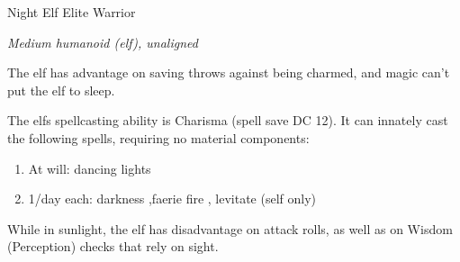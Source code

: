 \documentclass[letterpaper,10pt,twoside,twocolumn,openany]{book}
\begin{document}
\begin{monsterbox}{Night Elf Elite Warrior}
	\begin{hangingpar}
		\textit{Medium humanoid (elf), unaligned}
	\end{hangingpar}
	\dndline%
	\basics[%
	armorclass = 18,
	hitpoints  = 71,
	speed      = 30 ft
	]
	\dndline%
	\stats[
	STR = \stat{13}, %
	DEX = \stat{18},
	CON = \stat{14},
	INT = \stat{11},
	WIS = \stat{13},
	CHA = \stat{12}
	]
	\dndline%
	\details[%
	savingthrows = {Dex +7, Con +5, Wis +4},
	skills = {Perception +4, Stealth +10},
	senses = {darkvision 120 ft., passive perception 14},
	languages = {Elvish, undercommon, common},
	challenge = 5 (1800 XP)
	]
	\dndline%
	\begin{monsteraction}
		The elf has advantage on saving throws against being charmed, and magic can't put the elf to sleep.
	\end{monsteraction}	
	\begin{monsteraction}
		The elfs spellcasting ability is Charisma (spell save DC 12). It can innately cast the following spells, requiring no material components:
		\begin{enumerate}
			\item At will: dancing lights
			\item 1/day each: darkness ,faerie fire , levitate (self only)
		\end{enumerate}
	\end{monsteraction}	
	\begin{monsteraction}
		While in sunlight, the elf has disadvantage on attack rolls, as well as on Wisdom (Perception) checks that rely on sight.
	\end{monsteraction}	
	

\end{monsterbox}
\end{document}
